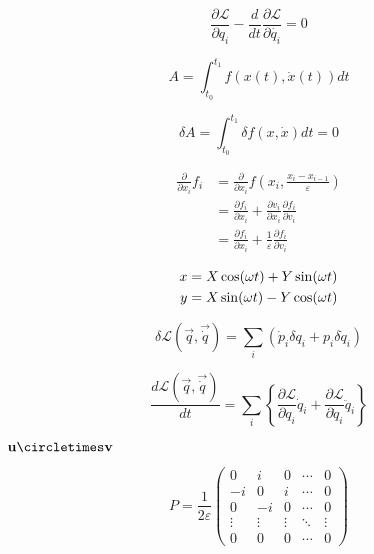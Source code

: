 $$
\frac{\partial \mathcal{L}}{\partial q_i} - \frac{d}{dt}\frac{\partial \mathcal{L}}{\partial \dot{q_i}} = 0
$$


$$ A = \int_{t_0}^{t_1} f(x(t), \dot{x}(t)) dt $$

$$
\delta A = \int_{t_0}^{t_1} \delta f(x, \dot{x})dt = 0
$$

\begin{align*}
    \frac{\partial}{\partial x_i} f_i &=
    \frac{\partial}{\partial x_i} f \left(x_i, \frac{x_i - x_{i-1}}{\varepsilon}\right) \\
    &= \frac{\partial f_i}{\partial x_i} + \frac{\partial v_i}{\partial x_i} \frac{\partial f_i}{\partial v_i} \\
    &= \frac{\partial f_i}{\partial x_i} + \frac{1}{\varepsilon} \frac{\partial f_i}{\partial v_i}
\end{align*}

\begin{align}
    x &= X \cos(\omega t) + Y \sin(\omega t) \notag \\
    y &= X \sin(\omega t) - Y \cos(\omega t) \label{eq:rotation}
\end{align}

$$
\delta \mathcal{L}(\vec{q}, \vec{\dot{q}}) = \sum_i \left( \dot{p}_i \delta q_i
+ p_i \delta \dot{q}_i \right)
$$

\begin{equation}
    \frac{d \mathcal{L}(\vec{q}, \vec{\dot{q}})}{dt} = \sum_i \left\{ \frac{\partial \mathcal{L}}{\partial q_i} \dot{q}_i
    + \frac{\partial \mathcal{L}}{\partial \dot{q}_i} \ddot{q}_i \right\} \label{eq:tsym}
\end{equation}

$ \mathbf{u} \circletimes \mathbf{v} $

$$
P =
\frac{1}{2\varepsilon}
\begin{pmatrix}
0 & i & 0 & \cdots & 0 \\
-i & 0 & i & \cdots & 0 \\
0 & -i & 0 & \cdots & 0 \\
\vdots & \vdots & \vdots & \ddots & \vdots \\
0 & 0 & 0 & \cdots & 0
\end{pmatrix}
$$
